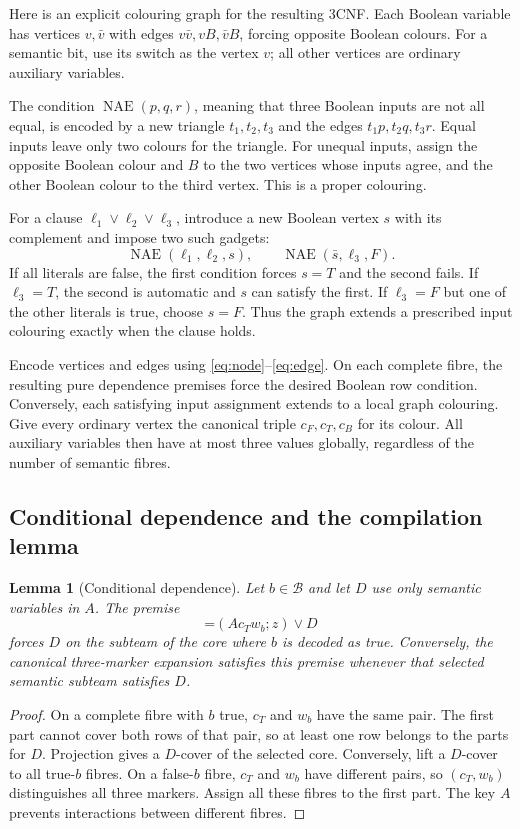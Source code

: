 \documentclass[11pt,a4paper]{article}
\newcommand{\dep}[2]{\mathord{=}(#1;#2)}
\newtheorem{lemma}[theorem]{Lemma}
\theoremstyle{definition}
\begin{document}
Here is an explicit colouring graph for the resulting 3CNF. Each
Boolean variable has vertices $v,\bar v$ with edges
$v\bar v,vB,\bar vB$, forcing opposite Boolean colours. For a semantic
bit, use its switch as the vertex $v$; all other vertices are ordinary
auxiliary variables.

The condition $\operatorname{NAE}(p,q,r)$, meaning that three Boolean
inputs are not all equal, is encoded by a new triangle $t_1,t_2,t_3$
and the edges $t_1p,t_2q,t_3r$. Equal inputs leave only two colours
for the triangle. For unequal inputs, assign the opposite Boolean
colour and $B$ to the two vertices whose inputs agree, and the other
Boolean colour to the third vertex. This is a proper colouring.

For a clause $\ell_1\vee\ell_2\vee\ell_3$, introduce a new Boolean
vertex $s$ with its complement and impose two such gadgets:
\[
 \operatorname{NAE}(\ell_1,\ell_2,s),\qquad
 \operatorname{NAE}(\bar s,\ell_3,F).
\]
If all literals are false, the first condition forces $s=T$ and the
second fails. If $\ell_3=T$, the second is automatic and $s$ can
satisfy the first. If $\ell_3=F$ but one of the other literals is true,
choose $s=F$. Thus the graph extends a prescribed input colouring
exactly when the clause holds.

Encode vertices and edges using \eqref{eq:node}--\eqref{eq:edge}.
On each complete fibre, the resulting pure dependence premises force
the desired Boolean row condition. Conversely, each satisfying input
assignment extends to a local graph colouring. Give every ordinary
vertex the canonical triple $c_F,c_T,c_B$ for its colour. All auxiliary
variables then have at most three values globally, regardless of the
number of semantic fibres.

\subsection{Conditional dependence and the compilation lemma}
\begin{lemma}[Conditional dependence]
\label{lem:conditional}
Let $b\in\mathcal B$ and let $D$ use only semantic variables in $A$.
The premise
\[
 \dep{A c_T w_b}z\vee D
\]
forces $D$ on the subteam of the core where $b$ is decoded as true.
Conversely, the canonical three-marker expansion satisfies this
premise whenever that selected semantic subteam satisfies $D$.
\end{lemma}
\begin{proof}
On a complete fibre with $b$ true, $c_T$ and $w_b$ have the same
pair. The first part cannot cover both rows of that pair, so at least
one row belongs to the parts for $D$. Projection gives a $D$-cover
of the selected core.
Conversely, lift a $D$-cover to all true-$b$ fibres. On a false-$b$
fibre, $c_T$ and $w_b$ have different pairs, so $(c_T,w_b)$ distinguishes
all three markers. Assign all these fibres to the first part. The
key $A$ prevents interactions between different fibres.
\end{proof}
\end{document}
